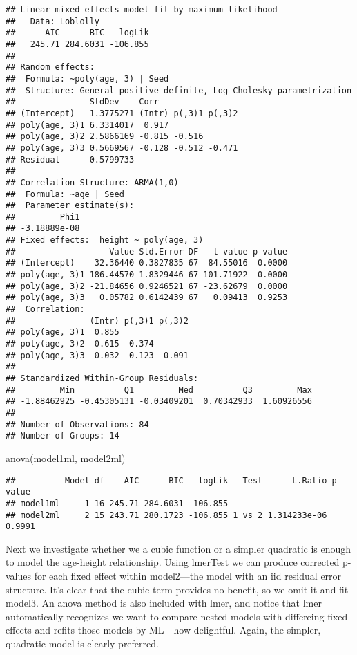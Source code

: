 \documentclass[
]{book}
\newenvironment{Shaded}{\begin{snugshade}}{\end{snugshade}}
\newcommand{\FunctionTok}[1]{\textcolor[rgb]{0.00,0.00,0.00}{#1}}
\newcommand{\NormalTok}[1]{#1}
\begin{document}
\begin{verbatim}
## Linear mixed-effects model fit by maximum likelihood
##   Data: Loblolly 
##      AIC      BIC   logLik
##   245.71 284.6031 -106.855
## 
## Random effects:
##  Formula: ~poly(age, 3) | Seed
##  Structure: General positive-definite, Log-Cholesky parametrization
##               StdDev    Corr                
## (Intercept)   1.3775271 (Intr) p(,3)1 p(,3)2
## poly(age, 3)1 6.3314017  0.917              
## poly(age, 3)2 2.5866169 -0.815 -0.516       
## poly(age, 3)3 0.5669567 -0.128 -0.512 -0.471
## Residual      0.5799733                     
## 
## Correlation Structure: ARMA(1,0)
##  Formula: ~age | Seed 
##  Parameter estimate(s):
##         Phi1 
## -3.18889e-08 
## Fixed effects:  height ~ poly(age, 3) 
##                   Value Std.Error DF   t-value p-value
## (Intercept)    32.36440 0.3827835 67  84.55016  0.0000
## poly(age, 3)1 186.44570 1.8329446 67 101.71922  0.0000
## poly(age, 3)2 -21.84656 0.9246521 67 -23.62679  0.0000
## poly(age, 3)3   0.05782 0.6142439 67   0.09413  0.9253
##  Correlation: 
##               (Intr) p(,3)1 p(,3)2
## poly(age, 3)1  0.855              
## poly(age, 3)2 -0.615 -0.374       
## poly(age, 3)3 -0.032 -0.123 -0.091
## 
## Standardized Within-Group Residuals:
##         Min          Q1         Med          Q3         Max 
## -1.88462925 -0.45305131 -0.03409201  0.70342933  1.60926556 
## 
## Number of Observations: 84
## Number of Groups: 14
\end{verbatim}

\begin{Shaded}
\begin{Highlighting}[]
\FunctionTok{anova}\NormalTok{(model1ml, model2ml)}
\end{Highlighting}
\end{Shaded}

\begin{verbatim}
##          Model df    AIC      BIC   logLik   Test      L.Ratio p-value
## model1ml     1 16 245.71 284.6031 -106.855                            
## model2ml     2 15 243.71 280.1723 -106.855 1 vs 2 1.314233e-06  0.9991
\end{verbatim}

Next we investigate whether we a cubic function or a simpler quadratic is enough to model the age-height relationship. Using lmerTest we can produce corrected p-values for each fixed effect within model2---the model with an iid residual error structure. It's clear that the cubic term provides no benefit, so we omit it and fit model3. An anova method is also included with lmer, and notice that lmer automatically recognizes we want to compare nested models with differeing fixed effects and refits those models by ML---how delightful. Again, the simpler, quadratic model is clearly preferred.
\end{document}
